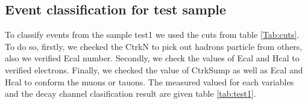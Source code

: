 \subsection{Event classification for test sample}


	
To classify events from the sample test1 we used the cuts from table \ref{Tab:cuts}. To do so, firstly, we checked the  CtrkN to pick out hadrons particle from others, also we verified  Ecal number. Secondly, we check the values of Ecal and Hcal to verified electrons. Finally, we checked the value of CtrkSump as well as  Ecal and Hcal to conform the muons or tauons. The measured valued for each variables and the decay channel clasification result are given table \ref{tab:test1}.


